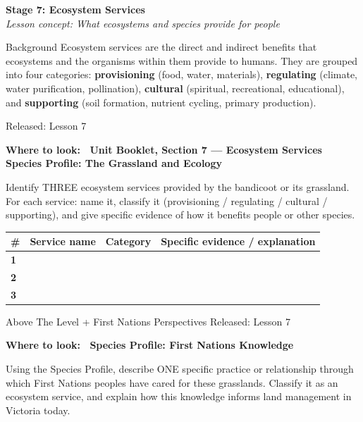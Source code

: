 \documentclass[11pt,a4paper]{article}
\newcommand{\wheretolook}[1]{%
  \par\vspace{2pt}\noindent
  \colorbox{GoldLight}{\parbox{\dimexpr\linewidth-2\fboxsep\relax}{%
    \small\color{GoldDark}\headingfont\bfseries Where to look:\ %
    \normalfont\color{DarkGrey}#1}}\par\vspace{4pt}}
\newcommand{\answerbox}[1]{%
  \begin{tcolorbox}[
    enhanced, breakable, arc=2mm,
    colback=Paper, colframe=Line,
    left=2mm, right=2mm, top=1mm, bottom=1mm,
    boxrule=1pt, height=#1
  ]
  \end{tcolorbox}%
}
\newcommand{\stagediv}[3]{%
  \needspace{6\baselineskip}
  \begin{tcolorbox}[
    enhanced, breakable=false, arc=3.5mm,
    colback=ForestDark, colframe=ForestDark, boxrule=0pt,
    sidebyside, sidebyside align=center,
    lefthand width=2.2cm,
    left=2mm, right=4mm, top=4mm, bottom=4mm
  ]
    \begin{center}
      {\headingfont\bfseries\color{Forest!35!ForestDark}\fontsize{42}{42}\selectfont #1}
    \end{center}
    \tcblower
    {\headingfont\bfseries\color{white}\large Stage #1: #2}\\[3pt]
    {\itshape\color{white!75!ForestDark}\small Lesson concept: #3}
  \end{tcolorbox}%
  \vspace{6pt}%
}
\newcommand{\yr}[2]{\noindent{\headingfont\bfseries\small\color{Forest}%
  \rule[0.2ex]{1.2em}{2pt}\hspace{4pt}#1}\hfill{\small\color{DarkGrey}#2}\\[2pt]}
\newcommand{\yrviii}[2]{\noindent{\headingfont\bfseries\small\color{Violet}%
  \rule[0.2ex]{1.2em}{2pt}\hspace{4pt}#1}\hfill{\small\color{DarkGrey}#2}\\[2pt]}
\begin{document}
\newpage

\stagediv{7}{Ecosystem Services}{What ecosystems and species provide for people}

\begin{contextbox}{Background}
Ecosystem services are the direct and indirect benefits that ecosystems and the organisms within them provide to humans. They are grouped into four categories: \textbf{provisioning} (food, water, materials), \textbf{regulating} (climate, water purification, pollination), \textbf{cultural} (spiritual, recreational, educational), and \textbf{supporting} (soil formation, nutrient cycling, primary production).
\end{contextbox}

\bigskip

\begin{yr7box}
\yr{At The Level}{Released: Lesson 7}

\wheretolook{Unit Booklet, Section 7 --- Ecosystem Services \textbullet{} \textbf{Species Profile: The Grassland} and \textbf{Ecology}}
Identify THREE ecosystem services provided by the bandicoot or its grassland. For each service: name it, classify it (provisioning / regulating / cultural / supporting), and give specific evidence of how it benefits people or other species.

\medskip
\noindent\begin{tabularx}{\linewidth}{|>{\bfseries}p{0.8cm}|p{4cm}|p{2.8cm}|X|}
  \hline
  \rowcolor{TableHead}
  \headingfont\bfseries\color{white} \# &
  \headingfont\bfseries\color{white} Service name &
  \headingfont\bfseries\color{white} Category &
  \headingfont\bfseries\color{white} Specific evidence / explanation \\
  \hline
  1 & & & \\[68pt]
  \hline
  \rowcolor{RowAlt}
  2 & & & \\[68pt]
  \hline
  3 & & & \\[68pt]
  \hline
\end{tabularx}
\end{yr7box}

\bigskip
\newpage
\begin{fnbox}{Above The Level + First Nations Perspectives}
\yrviii{ Perspectives }{Released: Lesson 7}
\wheretolook{\textbf{Species Profile: First Nations Knowledge}}
Using the Species Profile, describe ONE specific practice or relationship through which First Nations peoples have cared for these grasslands. Classify it as an ecosystem service, and explain how this knowledge informs land management in Victoria today.
\answerbox{18cm}
\end{fnbox}
\end{document}
